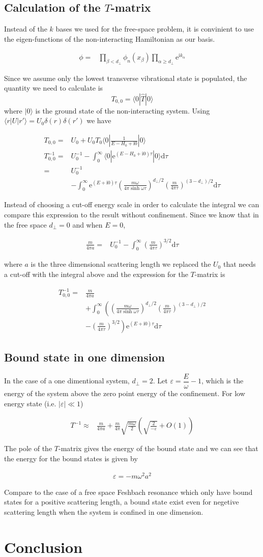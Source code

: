 \documentclass[aps,twocolumn,secnumarabic,balancelastpage,amsmath,amssymb,nofootinbib]{revtex4}
\newcommand{\ud}{\mathrm{d}}
\newcommand{\ue}{\mathrm{e}}
\newcommand{\ui}{\mathrm{i}}
\newcommand{\eqar}[1]
{
  \begin{align*}
    #1
  \end{align*}
}
\newcommand{\paren}[1]{{\left({#1}\right)}}
\newcommand{\lparen}[1]{{\left({#1}\right.}}
\newcommand{\rparen}[1]{{\left.{#1}\right)}}
\newcommand{\abs}[1]{{\left|{#1}\right|}}
\begin{document}
\subsection{Calculation of the $T$-matrix}
Instead of the $k$ bases we used for the free-space problem, it is convinient to use the eigen-functions of the non-interacting Hamiltonian as our basis.
\eqar{
  \phi=&\prod_{\beta<d_\perp}\phi_n\paren{x_\beta}\prod_{\alpha\geqslant d_\perp}\ue^{\ui k_\alpha}
}
Since we assume only the lowest transverse vibrational state is populated, the quantity we need to calculate is
\[T_{0,0}=\langle0|\hat T|0\rangle\]
where $|0\rangle$ is the ground state of the non-interacting system. Using $\langle r|U|r'\rangle=U_0\delta\paren{r}\delta\paren{r'}$ we have
\eqar{
  T_{0,0}=&U_0+U_0T_0\langle0|\frac{1}{E-H_0+\ui0}|0\rangle\\
  T_{0,0}^{-1}=&U_0^{-1}-\int_0^\infty\langle0|\ue^{\paren{E-H_0+\ui0}\tau}|0\rangle\ud\tau\\
  =&U_0^{-1}\\
  &-\int_0^\infty\ue^{\paren{E+\ui0}\tau}\paren{\frac{m\omega}{4\pi\sinh\omega\tau}}^{d_\perp/2}\paren{\frac{m}{4\pi\tau}}^{\paren{3-d_\perp}/2}\ud\tau
}
Instead of choosing a cut-off energy scale in order to calculate the integral we can compare this expression to the result without confinement. Since we know that in the free space $d_\perp=0$ and when $E=0$,
\eqar{
  \frac{m}{4\pi a}=&U_0^{-1}-\int_0^\infty\paren{\frac{m}{4\pi\tau}}^{3/2}\ud\tau
}
where $a$ is the three dimensional scattering length we replaced the $U_0$ that needs a cut-off with the integral above and the expression for the $T$-matrix is
\eqar{
  T_{0,0}^{-1}=&\frac{m}{4\pi a}\\
  &+\int_{0}^{\infty}\lparen{\paren{\frac{m\omega}{4\pi\sinh\omega\tau}}^{d_\perp/2}\paren{\frac{m}{4\pi\tau}}^{\paren{3-d_\perp}/2}}\\
  &\rparen{-\paren{\frac{m}{4\pi\tau}}^{3/2}}\ue^{\paren{E+\ui0}\tau}\ud\tau
}

\subsection{Bound state in one dimension}
In the case of a one dimentional system, $d_\perp=2$. Let $\varepsilon=\dfrac{E}{\omega}-1$, which is the energy of the system above the zero point energy of the confinement. For low energy state (i.e. $\abs{\varepsilon}\ll1$)
\eqar{
  T^{-1}\approx&\frac{m}{4\pi a}+\frac{m}{4\pi}\sqrt{\frac{m\omega}{2}}\paren{\sqrt{\frac{2}{-\varepsilon}}+O\paren{1}}
}
The pole of the $T$-matrix gives the energy of the bound state and we can see that the energy for the bound states is given by
\eqar{
  \varepsilon=-m\omega^2a^2
}
Compare to the case of a free space Feshbach resonance which only have bound states for a positive scattering length, a bound state exist even for negetive scattering length when the system is confined in one dimension.

\section{Conclusion}


\end{document}
